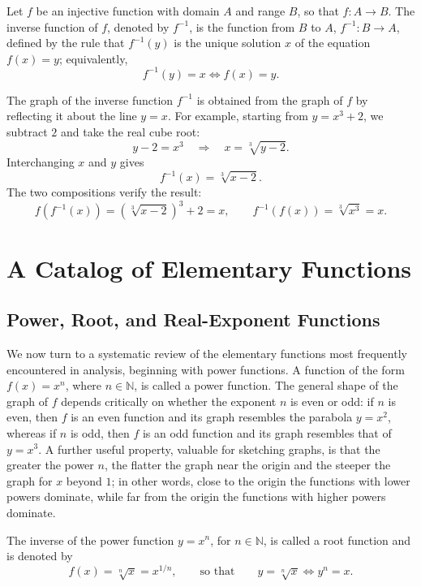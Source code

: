 \begin{definition}
Let $f$ be an injective function with domain $A$ and range $B$, so that $f : A \to B$. The inverse function of $f$, denoted by $f^{-1}$, is the function from $B$ to $A$, $f^{-1} : B \to A$, defined by the rule that $f^{-1}(y)$ is the unique solution $x$ of the equation $f(x) = y$; equivalently,
\[
f^{-1}(y) = x \iff f(x) = y.
\]

\end{definition}

The graph of the inverse function $f^{-1}$ is obtained from the graph of $f$ by reflecting it about the line $y=x$. For example, starting from $y=x^3+2$, we subtract $2$ and take the real cube root:
\[
y-2=x^3 \quad\Longrightarrow\quad x=\sqrt[3]{y-2}.
\]
Interchanging $x$ and $y$ gives
\[
f^{-1}(x)=\sqrt[3]{x-2}.
\]
The two compositions verify the result:
\[
f(f^{-1}(x))=(\sqrt[3]{x-2})^3+2=x,
\qquad
f^{-1}(f(x))=\sqrt[3]{x^3}=x.
\]



\section{A Catalog of Elementary Functions}

\subsection{Power, Root, and Real-Exponent Functions}

We now turn to a systematic review of the elementary functions most frequently encountered in analysis, beginning with power functions. A function of the form $f(x) = x^n$, where $n \in \mathbb{N}$, is called a power function. The general shape of the graph of $f$ depends critically on whether the exponent $n$ is even or odd: if $n$ is even, then $f$ is an even function and its graph resembles the parabola $y = x^2$, whereas if $n$ is odd, then $f$ is an odd function and its graph resembles that of $y = x^3$. A further useful property, valuable for sketching graphs, is that the greater the power $n$, the flatter the graph near the origin and the steeper the graph for $x$ beyond $1$; in other words, close to the origin the functions with lower powers dominate, while far from the origin the functions with higher powers dominate.

The inverse of the power function $y = x^n$, for $n \in \mathbb{N}$, is called a root function and is denoted by
\[
f(x) = \sqrt[n]{x} = x^{1/n}, \qquad \text{so that} \qquad y = \sqrt[n]{x} \iff y^n = x.
\]

